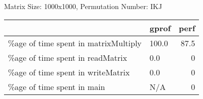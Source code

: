 \documentclass{article}
\begin{document}
    Matrix Size: 1000x1000, Permutation Number: IKJ \\
    \begin{tabular}{llr}
\hline
                                      & gprof   &   perf \\
\hline
 \%age of time spent in matrixMultiply & 100.0   &   87.5 \\
 \%age of time spent in readMatrix     & 0.0     &    0   \\
 \%age of time spent in writeMatrix    & 0.0     &    0   \\
 \%age of time spent in main           & N/A     &    0   \\
\hline
\end{tabular}
    
\end{document}
